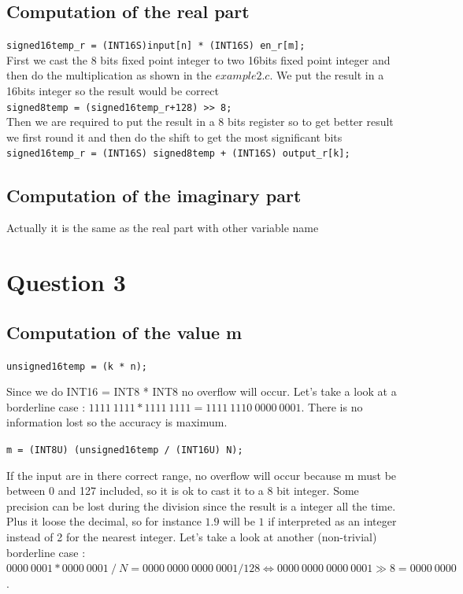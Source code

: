 \documentclass[a4paper]{article}
\begin{document}
\subsection{Computation of the real part}

\verb|signed16temp_r = (INT16S)input[n] * (INT16S) en_r[m];|
\\
First we cast the 8 bits fixed point integer to two 16bits fixed point integer and then do the multiplication as shown in the $example2.c$. We put the result in a 16bits integer so the result would be correct\\
\verb|signed8temp = (signed16temp_r+128) >> 8;|
\\
Then we are required to put the result in a 8 bits register so to get better result we first round it  and then do the shift to get the most significant bits
\\
\verb|signed16temp_r = (INT16S) signed8temp + (INT16S) output_r[k];|
\\

\subsection{Computation of the imaginary part}

Actually it is the same as the real part with other variable name


\section{Question 3}

\subsection{Computation of the value m}

\verb|unsigned16temp = (k * n);|

Since we do INT16 = INT8 * INT8 no overflow will occur. Let's take a look at a borderline case :   $ 1111\ 1111 * 1111\ 1111 = 1111\ 1110\ 0000\ 0001 $. There is no information lost so the accuracy is maximum.

\verb|m = (INT8U) (unsigned16temp / (INT16U) N);|

If the input are in there correct range, no overflow will occur because m must be between 0 and 127 included, so it is ok to cast it to a 8 bit integer. Some precision can be lost during the division since the result is a integer all the time. Plus it loose the decimal, so for instance $1.9$ will be $1$ if interpreted as an integer instead of 2 for the nearest integer. Let's take a look at another (non-trivial) borderline case :   $ 0000\ 0001 * 0000\ 0001\ /\ N = 0000\ 0000\ 0000\ 0001 / 128 \Leftrightarrow 0000\ 0000\ 0000\ 0001 \gg 8 = 0000\ 0000 $.
\end{document}
